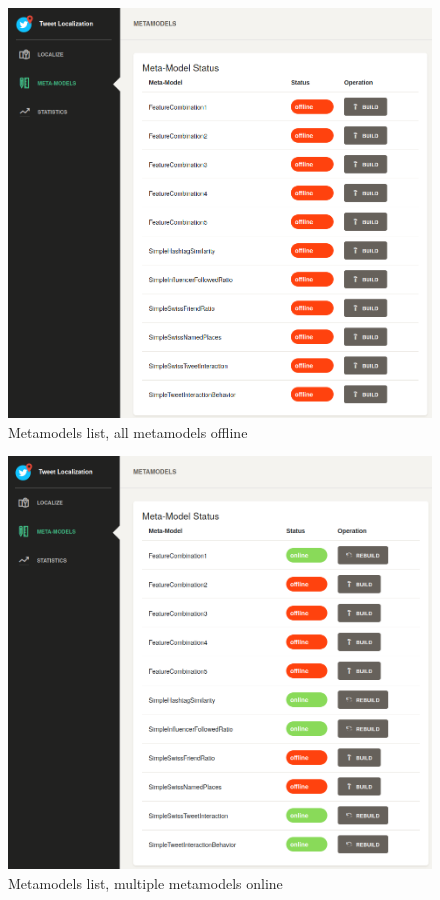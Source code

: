 \documentclass[10pt,a4paper]{article}
\begin{document}
\begin{figure}
	\centering
	\includegraphics[scale=0.3]{metamodels-initial}
	\caption{Metamodels list, all metamodels offline}
	\label{fig:metamodels-initial}
\end{figure}

\begin{figure}
	\centering
	\includegraphics[scale=0.3]{metamodels-built}
	\caption{Metamodels list, multiple metamodels online}
	\label{fig:metamodels-built}
\end{figure}
\end{document}
